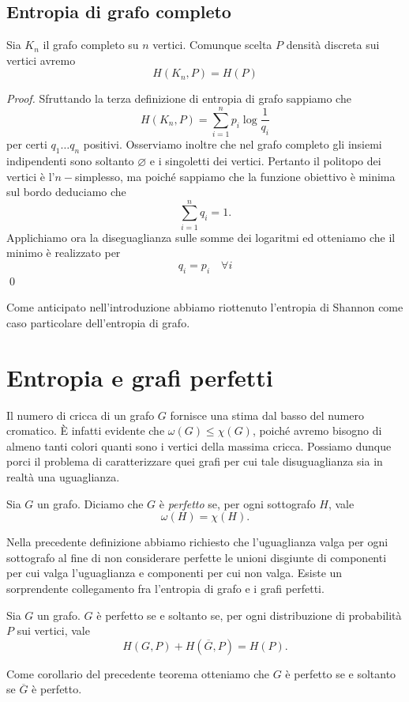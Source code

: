 \subsection{Entropia di grafo completo} 
\begin{proposition}
	Sia \(K_n\) il grafo completo su \(n\) vertici. Comunque scelta \(P\) densità discreta sui vertici avremo
	\[H(K_n,P)=H(P)\]
\end{proposition}
\begin{proof}
	Sfruttando la terza definizione di entropia di grafo sappiamo che
	\[H(K_n,P)=\sum_{i=1}^n p_i \log{\frac{1}{q_i}}\]
	per certi \(q_1\dots q_n\) positivi. Osserviamo inoltre che nel grafo completo gli insiemi indipendenti sono soltanto \(\varnothing\) e i singoletti dei vertici. Pertanto il politopo dei vertici è l'\(n-\)simplesso, ma poiché sappiamo che la funzione obiettivo è minima sul bordo deduciamo che
	\[\sum_{i=1}^n q_i = 1.\]
	Applichiamo ora la diseguaglianza sulle somme dei logaritmi ed otteniamo che il minimo è realizzato per
	\[q_i = p_i\quad \forall i\]
	\qed 
\end{proof}
\begin{remark}
	Come anticipato nell'introduzione abbiamo riottenuto l'entropia di Shannon come caso particolare dell'entropia di grafo. 
\end{remark}

\section{Entropia e grafi perfetti} Il numero di cricca di un grafo \(G\) fornisce una stima dal basso del numero cromatico. È infatti evidente che \(\omega(G)\le\chi(G)\), poiché avremo bisogno di almeno tanti colori quanti sono i vertici della massima cricca. Possiamo dunque porci il problema di caratterizzare quei grafi per cui tale disuguaglianza sia in realtà una uguaglianza. 
\begin{definition}
	Sia \(G\) un grafo. Diciamo che \(G\) è \emph{perfetto} se, per ogni sottografo \(H\), vale
	\[\omega(H)=\chi(H).\]
\end{definition}
Nella precedente definizione abbiamo richiesto che l'uguaglianza valga per ogni sottografo al fine di non considerare perfette le unioni disgiunte di componenti per cui valga l'uguaglianza e componenti per cui non valga. Esiste un sorprendente collegamento fra l'entropia di grafo e i grafi perfetti. 
\begin{theorem}
	 Sia \(G\) un grafo. \(G\) è perfetto se e soltanto se, per ogni distribuzione di probabilità \(P\) sui vertici, vale
	\[H\left(G,P\right)+H\left(\overline{G},P\right)=H(P).\]
	\label{lovasztheorem}
\end{theorem}
Come corollario del precedente teorema otteniamo che \(G\) è perfetto se e soltanto se \(\overline{G}\) è perfetto.

